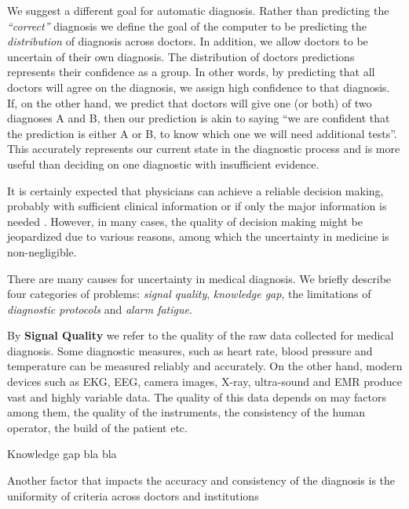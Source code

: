 \documentclass[11pt]{pnas-new}
\begin{document}
We suggest a different goal for automatic diagnosis.
Rather than predicting the {\em ``correct''}
diagnosis we define the goal of the computer to be predicting the {\em
  distribution} of diagnosis across doctors. In addition, we allow
doctors to be uncertain of their own diagnosis.
The distribution of doctors predictions represents their confidence as
a group. In other words, by predicting that all doctors will agree on
the diagnosis, we assign high confidence to that diagnosis. 
If, on the other hand, we
predict that doctors will give one (or both) of two diagnoses A and B, then
our prediction is akin to saying ``we are confident that the prediction
is either A or B, to know which one we will need additional
tests''. This accurately represents our current state in the
diagnostic process and is more useful than deciding on one diagnostic
with insufficient evidence.

It is certainly expected that physicians can achieve a reliable
decision making, probably with sufficient clinical information
\cite{mehta2011agreement} or if only the major information is needed
\cite{atiya2003interobserver}. However, in many cases, the quality of
decision making might be jeopardized due to various reasons, among
which the uncertainty in medicine is non-negligible.

There are many causes for uncertainty in medical diagnosis. We briefly
describe four categories of problems: {\em signal quality}, {\em knowledge gap}, the limitations of {\em
  diagnostic protocols} and {\em alarm fatigue}.


By {\bf Signal Quality} we refer to the quality of the raw data
collected for medical diagnosis. Some diagnostic measures, such
as heart rate, blood pressure and temperature can be measured reliably
and accurately. On the other hand, modern
devices such as EKG, EEG, camera images, X-ray, ultra-sound and EMR
produce vast and highly variable data. The quality of this data
depends on may factors among them, the quality of the instruments, the
consistency of the human operator, the build of the patient etc.


Knowledge gap bla bla


\newpage
Another factor that impacts the accuracy and consistency of the
diagnosis is the uniformity of criteria across doctors and institutions

\end{document}
